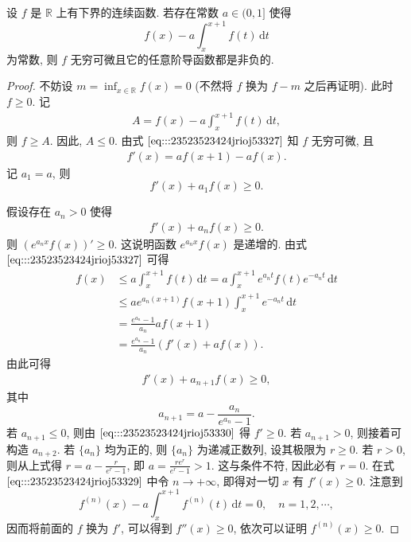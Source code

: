 \documentclass[../../main.tex]{subfiles}%
\begin{document}
\begin{example}
设 \( f \) 是 \( \mathbb{R} \) 上有下界的连续函数. 若存在常数 \( a \in (0,1] \) 使得  
\[
f(x) - a \int_{x}^{x + 1} f(t) \, \mathrm{d}t
\]  
为常数, 则 \( f \) 无穷可微且它的任意阶导函数都是非负的.  
\end{example}
\begin{proof}

不妨设 \( m = \inf_{x \in \mathbb{R}} f(x) = 0 \) (不然将 \( f \) 换为 \( f - m \) 之后再证明). 此时 \( f \geqslant 0 \). 记  
\begin{align}
A = f(x) - a \int_{x}^{x + 1} f(t) \, \mathrm{d}t, \label{eq:::23523523424jrioj53327}
\end{align}
则 \( f \geqslant A \). 因此, \( A \leqslant 0 \). 由式 \(\eqref{eq:::23523523424jrioj53327}\) 知 \( f \) 无穷可微, 且  
\begin{align}
f'(x) = a f(x + 1) - a f(x). \label{eq:::23523523424jrioj53328}
\end{align}  
记 \( a_1 = a \), 则  
\[
f'(x) + a_1 f(x) \geqslant 0.
\]  

假设存在 \( a_n > 0 \) 使得  
\begin{align}
f'(x) + a_n f(x) \geqslant 0. \label{eq:::23523523424jrioj53329}
\end{align}  
则 \( (e^{a_n x} f(x))' \geqslant 0 \). 这说明函数 \( e^{a_n x} f(x) \) 是递增的. 由式 \(\eqref{eq:::23523523424jrioj53327}\) 可得  
\[
\begin{aligned}
f(x) &\leqslant a \int_{x}^{x + 1} f(t) \, \mathrm{d}t = a \int_{x}^{x + 1} e^{a_n t} f(t) e^{-a_n t} \, \mathrm{d}t \\
&\leqslant a e^{a_n (x + 1)} f(x + 1) \int_{x}^{x + 1} e^{-a_n t} \, \mathrm{d}t \\
&= \frac{e^{a_n} - 1}{a_n} a f(x + 1) \\
&= \frac{e^{a_n} - 1}{a_n} (f'(x) + a f(x)).
\end{aligned}
\]  
由此可得  
\begin{align}
f'(x) + a_{n + 1} f(x) \geqslant 0, \label{eq:::23523523424jrioj53330}
\end{align}  
其中  
\[
a_{n + 1} = a - \frac{a_n}{e^{a_n} - 1}.
\]  
若 \( a_{n + 1} \leqslant 0 \), 则由 \(\eqref{eq:::23523523424jrioj53330}\) 得 \( f' \geqslant 0 \). 若 \( a_{n + 1} > 0 \), 则接着可构造 \( a_{n + 2} \). 若 \( \{a_n\} \) 均为正的, 则 \( \{a_n\} \) 为递减正数列, 设其极限为 \( r \geqslant 0 \). 若 \( r > 0 \), 则从上式得 \( r = a - \frac{r}{e^r - 1} \), 即 \( a = \frac{r e^r}{e^r - 1} > 1 \). 这与条件不符, 因此必有 \( r = 0 \). 在式 \(\eqref{eq:::23523523424jrioj53329}\) 中令 \( n \to +\infty \), 即得对一切 \( x \) 有 \( f'(x) \geqslant 0 \). 注意到  
\[
f^{(n)}(x) - a \int_{x}^{x + 1} f^{(n)}(t) \, \mathrm{d}t = 0, \quad n = 1, 2, \cdots,
\]  
因而将前面的 \( f \) 换为 \( f' \), 可以得到 \( f''(x) \geqslant 0 \), 依次可以证明 \( f^{(n)}(x) \geqslant 0 \).

\end{proof}
\end{document}
